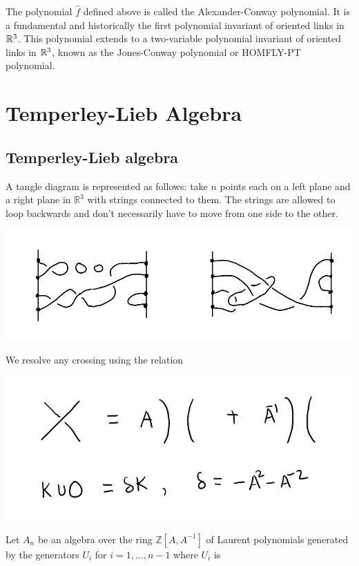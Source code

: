 The polynomial $\hat{f}$ defined above is called the Alexander-Conway polynomial. It is a fundamental and historically the first polynomial invariant of oriented links in $\mathbb{R}^3$. This polynomial extends to a two-variable polynomial invariant of oriented links in $\mathbb{R}^3$, known as the Jones-Conway polynomial or HOMFLY-PT polynomial.

\section{Temperley-Lieb Algebra}
\label{Temperley}

\subsection{Temperley-Lieb algebra}

  A tangle diagram is represented as follows: take $n$ points each on a left
  plane and a right plane in $\mathbb{R}^3$ with strings connected to them. The strings are allowed to loop backwards and don’t necessarily have to move from one side to the other.
  
\begin{center}
  \includegraphics[scale=.25]{images/8.png}
\end{center}

We resolve any crossing using the relation 
\begin{center}
  \includegraphics[scale=.25]{images/9.png}
\end{center}

  Let $A_n$ be an algebra over the ring $\mathbb{Z}[A, A^{-1}]$ of Laurent polynomials generated by the generators $U_i$ for $i = 1,\ldots, n-1$ where $U_i$ is 
  
